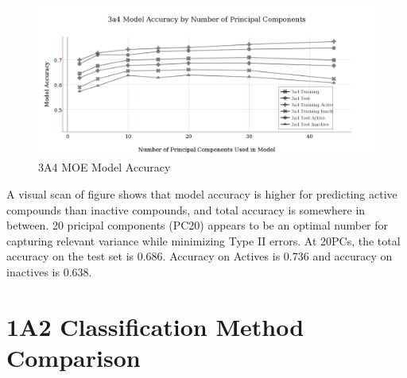 \begin{figure}[!htbp]
\includegraphics[width=1\textwidth]{../img/3a4_moe_model_accuracy.png}
\caption{3A4 MOE Model Accuracy}
\end{figure}

A visual scan of figure shows that model accuracy is higher for predicting active compounds than inactive compounds, and total accuracy is somewhere in between. 20 pricipal components (PC20) appears to be an optimal number for capturing relevant variance while minimizing Type II errors. At 20PCs, the total accuracy on the test set is 0.686. Accuracy on Actives is 0.736 and accuracy on inactives is 0.638.



\section{1A2 Classification Method Comparison}

